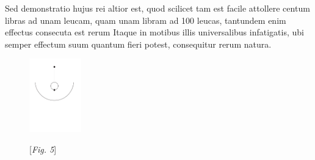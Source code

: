\pend
\pstart
Sed demonstratio hujus rei altior est, quod scilicet tam est facile attollere centum libras ad unam leucam, quam unam libram ad 100 leucas, tantundem enim effectus consecuta est rerum 
\pend
\pstart
Itaque in motibus illis universalibus infatigatis, ubi semper effectum suum quantum fieri potest, consequitur rerum natura.\\
\begin{figure}
\centering\includegraphics[width=0.2\textwidth]{images/lh0351303_035r-d5.pdf}\\
\rule[0cm]{0mm}{0cm}[\textit{Fig. 5}]
\end{figure}
\pend
\count{}
\count{}
\count{}
 

